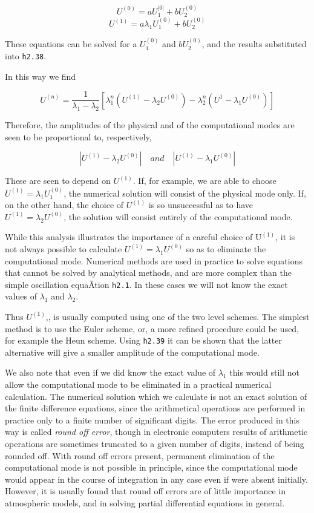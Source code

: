 \[U^{\left( 0 \right)} = a U_{1}^{\left| 0 \right|} + b U_{2}^{\left( 0 \right)}\]\[U^{\left( 1 \right)} = a\lambda_{1}U_{1}^{\left( 0 \right)} + b U_{2}^{\left( 0 \right)}\]

These equations can be solved for a \(U_{1}^{\left( 0 \right)}\) and
\(bU_{2}^{\left( 0 \right)}\), and the results substituted into
\texttt{h2.38}.

In this way we find

{\[U^{(n)} = \frac{1}{\lambda_1 - \lambda_2} \left[ \lambda_1^n\left( U^{(1)}
 - \lambda_{2}U^{(0)} \right) - \lambda_2^n\left( U^1 - \lambda_{1}U^{(0)} \right) \right]\]}

Therefore, the amplitudes of the physical and of the computational modes
are seen to be proportional to, respectively,

\[|U^{(1)} - \lambda_2 U^{(0)}| \quad   and   \quad | U^{(1)} - \lambda_1 U^{(0)} |\]

These are seen to depend on \(U^{\left( 1 \right)}\). If, for example,
we are able to choose
\(U^{\left( 1 \right)} = \lambda_{1}U_{1}^{\left( 0 \right)}\), the
numerical solution will consist of the physical mode only. If, on the
other hand, the choice of \(U^{\left( 1 \right)}\) is so unsuccessful as
to have \(U^{\left( 1 \right)} = \lambda_{2}U^{\left( 0 \right)}\), the
solution will consist entirely of the computational mode.

While this analysis illustrates the importance of a careful choice of
\(\text{U}^{\left( 1 \right)}\), it is not always possible to calculate
\(U^{\left( 1 \right)} = \lambda_{1}U^{\left( 0 \right)}\) so as to
eliminate the computational mode. Numerical methods are used in practice
to solve equations that cannot be solved by analytical methods, and are
more complex than the simple oscillation equaÂ­tion \texttt{h2.1}. In
these cases we will not know the exact values of \(\lambda_{1}\) and
\(\lambda_{2}\).

Thus \(U^{\left( 1 \right)}\),, is usually computed using one of the two
level schemes. The simplest method is to use the Euler scheme, or, a
more refined procedure could be used, for example the Heun scheme. Using
\texttt{h2.39} it can be shown that the latter alternative will give a
smaller amplitude of the computational mode.

We also note that even if we did know the exact value of \(\lambda_{1}\)
this would still not allow the computational mode to be eliminated in a
practical numerical calculation. The numerical solution which we
calculate is not an exact solution of the finite difference equations,
since the arithmetical operations are performed in practice only to a
finite number of significant digits. The error produced in this way is
called \emph{round off error}, though in electronic computers results of
arithmetic operations are sometimes truncated to a given number of
digits, instead of being rounded off. With round off errors present,
permanent elimination of the computational mode is not possible in
principle, since the computational mode would appear in the course of
integration in any case even if were absent initially. However, it is
usually found that round off errors are of little importance in
atmospheric models, and in solving partial differential equations in
general.

